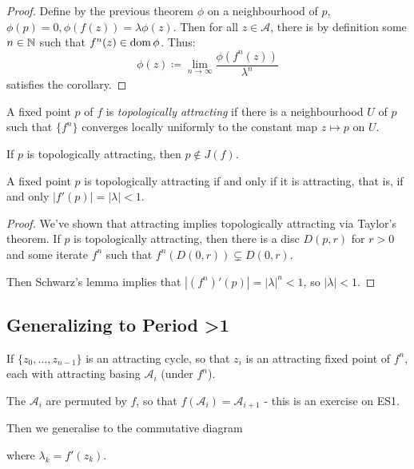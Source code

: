 \documentclass[10pt,a4paper]{article}
\begin{document}
\begin{proof}
  Define by the previous theorem $\phi$ on a neighbourhood of $p$, $\phi(p) = 0, \phi(f(z))=\lambda \phi(z)$. Then for all $z \in \mathcal{A}$, there is by definition some $n \in \mathbb{N}$ such that $f^{n}(z) \in \operatorname{dom} \phi$. Thus:
  \[\phi(z) \coloneqq \lim_{n\to\infty} \frac{\phi(f^n(z))}{\lambda^n}\]
  satisfies the corollary.
\end{proof}
\begin{definition}
  A fixed point $p$ of $f$ is \emph{topologically attracting} if there is a neighbourhood $U$ of $p$ such that $\{f^n\}$ converges locally uniformly to the constant map $z \mapsto p$ on $U$.
\end{definition}
If $p$ is topologically attracting, then $p \notin J(f)$.

\begin{lemma}
  A fixed point $p$ is topologically attracting if and only if it is attracting, that is, if and only $|f'(p)|=|\lambda| < 1$.
\end{lemma}
\begin{proof}
  We've shown that attracting implies topologically attracting via Taylor's theorem. If $p$ is topologically attracting, then there is a disc $D(p,r)$ for $r>0$ and some iterate $f^n$ such that $f^n(D(0,r))\subsetneq D(0,r)$.

  Then Schwarz's lemma implies that $|(f^n)'(p)|=|\lambda|^n < 1$, so $|\lambda|<1$.
\end{proof}
\subsection{Generalizing to Period >1}
If $\{z_0, \ldots, z_{n-1}\}$ is an attracting cycle, so that $z_i$ is an attracting fixed point of $f^n$, each with attracting basing $\mathcal{A}_i$ (under $f^n$).

The $\mathcal{A}_i$ are permuted by $f$, so that $f(\mathcal{A}_i) = \mathcal{A}_{i+1}$ - this is an exercise on ES1.

Then we generalise to the commutative diagram
\begin{center}
\end{center}
where $\lambda_k = f'(z_k)$.
\end{document}
